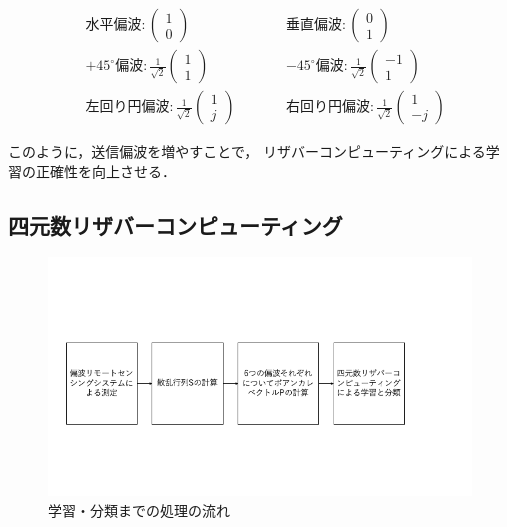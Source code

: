 \documentclass[uplatex,a4paper,12pt]{jsarticle}
\begin{document}
\begin{align*}
    &水平偏波: \left(
        \begin{array}{c}
            1 \\
            0
        \end{array}
        \right) \qquad
    &&垂直偏波: \left(
        \begin{array}{c}
            0 \\
            1
        \end{array}
        \right)\\
    &+45^\circ 偏波: \frac{1}{\sqrt{2}}\left(
        \begin{array}{c}
            1 \\
            1
        \end{array}
        \right) \qquad
    &&-45^\circ 偏波: \frac{1}{\sqrt{2}}\left(
        \begin{array}{c}
            -1 \\
            1
        \end{array}
    \right)\\
    &左回り円偏波: \frac{1}{\sqrt{2}}\left(
        \begin{array}{c}
            1 \\
            j
        \end{array}
        \right) \qquad
    &&右回り円偏波: \frac{1}{\sqrt{2}}\left(
        \begin{array}{c}
            1 \\
            -j
        \end{array}
        \right)
\end{align*}

このように，送信偏波を増やすことで，
リザバーコンピューティングによる学習の正確性を向上させる．

\subsection{四元数リザバーコンピューティング}
\begin{figure}[hbtp]
	\centering
	\includegraphics[scale=0.4]{../img/process.png}
    \caption{学習・分類までの処理の流れ}
	\label{fig:process}
\end{figure}
\end{document}
